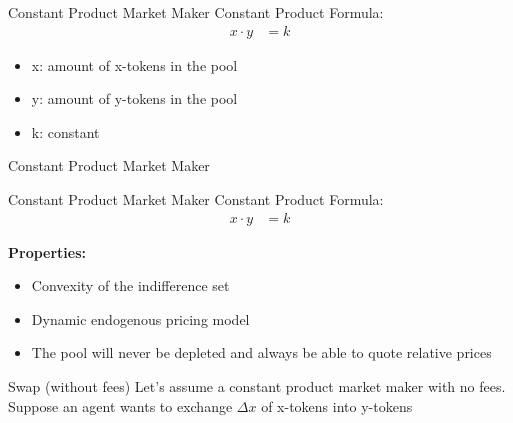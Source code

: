 \documentclass[]{beamer}
\begin{document}
\begin{frame}{Constant Product Market Maker}
Constant Product Formula:
	\begin{align*}
		x \cdot y &= k
	\end{align*}

	\begin{itemize}
		\item[] x: amount of x-tokens in the pool
		\item[] y: amount of y-tokens in the pool
		\item[] k: constant
	\end{itemize}
	\vspace{1cm}
\end{frame}


\begin{frame}{Constant Product Market Maker}
	\begin{figure}[h!]
		\begin{center}
			
		\end{center}
	\end{figure}
\end{frame}


\begin{frame}{Constant Product Market Maker}
Constant Product Formula:
	\begin{align*}
		x \cdot y &= k
	\end{align*}
	
	\textbf{Properties:}
	\begin{itemize}
		\item<1-> Convexity of the indifference set
		\item<2-> Dynamic endogenous pricing model
		\item<3-> The pool will never be depleted and always be able to quote relative prices
	\end{itemize}
\end{frame}

\begin{frame}{Swap (without fees)}
	Let's assume a constant product market maker with no fees. Suppose an agent wants to exchange $\Delta x$ of x-tokens into y-tokens
	\vspace{0.5cm}
	\begin{figure}[h!]
		\begin{center}
			
		\end{center}
	\end{figure}	
\end{frame}
\end{document}
